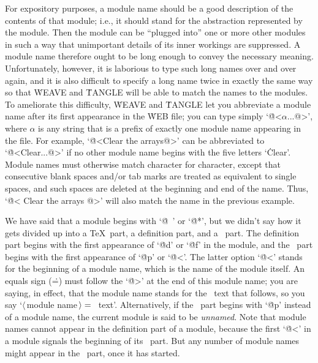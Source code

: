 For expository purposes, a module name should be a good description of the
contents of that module; i.e., it should stand for the abstraction
represented by the module. Then the module can be ``plugged into'' one or
more other modules in such a way
that unimportant details of its inner workings
are suppressed.  A module name therefore ought to be long enough to convey
the necessary meaning. Unfortunately, however, it is laborious to type
such long names over and over again, and it is also difficult to specify a
long name twice in exactly the same way so that \.{WEAVE} and \.{TANGLE}
will be able to match the names to the modules. To ameliorate this difficulty,
\.{WEAVE} and \.{TANGLE} let you abbreviate a module name
after its first appearance in the \.{WEB} file; you can type simply
`\.{@<$\alpha$...@>}', where $\alpha$ is any string that is a prefix of
exactly one module name appearing in the file. For example, `\.{@<Clear
the arrays@>}' can be abbreviated to `\.{@<Clear...@>}' if no other module
name begins with the five letters `\.{Clear}'. Module names must otherwise
match character for character, except that consecutive blank spaces and/or
tab marks are treated as equivalent to single spaces, and such spaces are
deleted at the beginning and end of the name. Thus, `\.{@< Clear { }the
arrays @>}' will also match the name in the previous example.

We have said that a module begins with `\.{@\ }' or `\.{@*}', but we
didn't say how it gets divided up into a \TeX\ part, a definition part,
and a \PASCAL\ part. The definition part begins with the first appearance
of `\.{@d}' or `\.{@f}' in the module, and the \PASCAL\ part begins with
the first appearance of `\.{@p}' or `\.{@<}'. The latter option `\.{@<}'
stands for the beginning of a module name, which is the name of the module
itself. An equals sign (\.=) must follow the `\.{@>}' at the end of this
module name; you are saying, in effect, that the module name stands for
the \PASCAL\ text that follows, so you say `$\langle\,$module
name$\,\rangle=\null$\PASCAL\ text'. Alternatively, if the \PASCAL\ part
begins with `\.{@p}' instead of a module name, the current module is said
to be {\sl unnamed}. Note that module names cannot appear in the
definition part of a module, because the first `\.{@<}' in a module
signals the beginning of its \PASCAL\ part.  But any number of module names
might appear in the \PASCAL\ part, once it has started.


